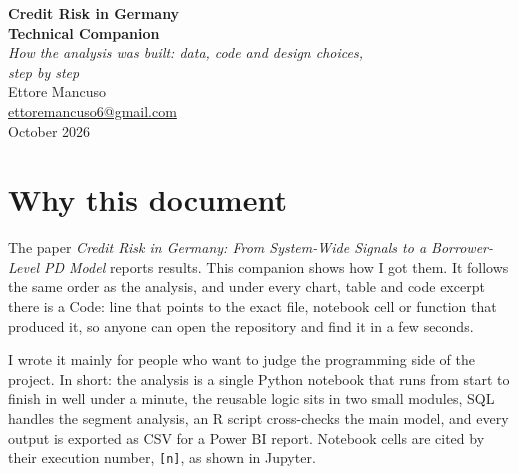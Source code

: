 \documentclass[11pt,a4paper]{article}
\begin{document}
\thispagestyle{empty}
\begin{center}
{\LARGE\bfseries Credit Risk in Germany\\[4pt] Technical Companion}\\[10pt]
{\large\itshape How the analysis was built: data, code and design choices,\\ step by step}\\[22pt]
{\large Ettore Mancuso}\\[1pt]
\href{mailto:ettoremancuso6@gmail.com}{ettoremancuso6@gmail.com}\\[1pt]
October 2026
\end{center}
\vspace{12pt}

\section*{Why this document}
The paper \textit{Credit Risk in Germany: From System-Wide Signals to a Borrower-Level PD Model} reports results. This companion shows how I got them. It follows the same order as the analysis, and under every chart, table and code excerpt there is a \textsf{Code:} line that points to the exact file, notebook cell or function that produced it, so anyone can open the repository and find it in a few seconds.

I wrote it mainly for people who want to judge the programming side of the project. In short: the analysis is a single Python notebook that runs from start to finish in well under a minute, the reusable logic sits in two small modules, SQL handles the segment analysis, an R script cross-checks the main model, and every output is exported as CSV for a Power BI report. Notebook cells are cited by their execution number, \texttt{[n]}, as shown in Jupyter.
\end{document}
